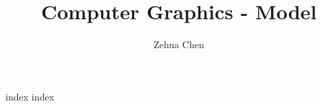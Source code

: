 \documentclass[letterpaper, 11pt]{report}
\title{Computer Graphics - Model}
\author{Zehua Chen}
\begin{document}
  \maketitle
  \tableofcontents

  {index}
  {index}
\end{document}
